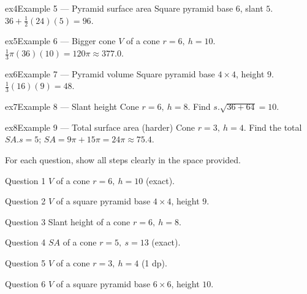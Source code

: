\documentclass[11pt]{article}
\begin{document}
\begin{example}{ex4}{Example 5 --- Pyramid surface area}
Square pyramid base $6$, slant $5$.\soln $36+\tfrac12(24)(5)=96$.
\end{example}

\begin{example}{ex5}{Example 6 --- Bigger cone}
$V$ of a cone $r=6,\ h=10$.\soln $\tfrac13\pi(36)(10)=120\pi\approx377.0$.
\end{example}

\begin{example}{ex6}{Example 7 --- Pyramid volume}
Square pyramid base $4\times4$, height $9$.\soln $\tfrac13(16)(9)=48$.
\end{example}

\begin{example}{ex7}{Example 8 --- Slant height}
Cone $r=6,\ h=8$. Find $s$.\soln $\sqrt{36+64}=10$.
\end{example}

\begin{example}{ex8}{Example 9 --- Total surface area (harder)}
Cone $r=3,\ h=4$. Find the total $SA$.\soln $s=5$; $SA=9\pi+15\pi=24\pi\approx75.4$.
\end{example}

\clearpage
{}
For each question, show all steps clearly in the space provided.

\begin{qbox}{Question 1}
$V$ of a cone $r=6,\ h=10$ (exact).\workspace{2.0cm}
\end{qbox}

\begin{qbox}{Question 2}
$V$ of a square pyramid base $4\times4$, height $9$.\workspace{2.0cm}
\end{qbox}

\begin{qbox}{Question 3}
Slant height of a cone $r=6,\ h=8$.\workspace{2.0cm}
\end{qbox}

\begin{qbox}{Question 4}
$SA$ of a cone $r=5,\ s=13$ (exact).\workspace{2.0cm}
\end{qbox}

\begin{qbox}{Question 5}
$V$ of a cone $r=3,\ h=4$ (1 dp).\workspace{2.0cm}
\end{qbox}

\begin{qbox}{Question 6}
$V$ of a square pyramid base $6\times6$, height $10$.\workspace{2.0cm}
\end{qbox}
\end{document}
